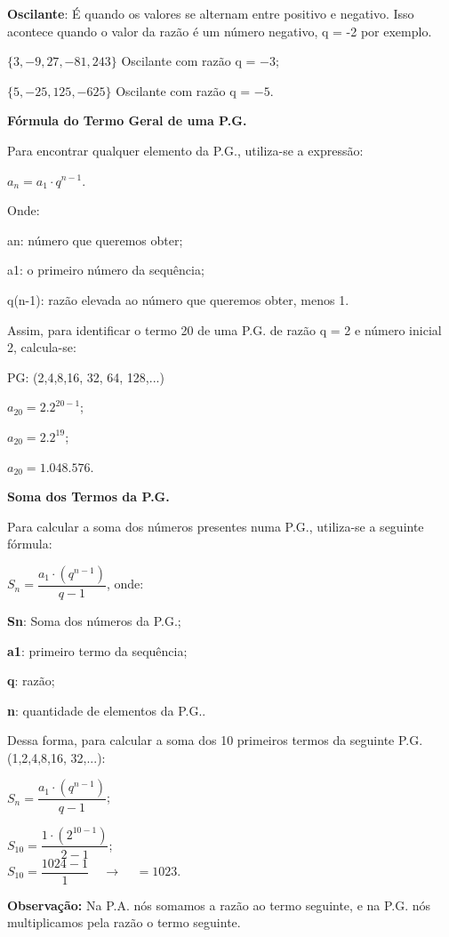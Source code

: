 \begin{multicols*}{2}
    \textbf{Oscilante}: É quando os valores se alternam entre positivo e negativo. Isso acontece quando o valor da razão é um número negativo, q = -2 por exemplo.

    $ \{ 3, -9, 27, -81, 243 \}$ Oscilante com razão q = $-3$;

    $ \{ 5, -25, 125, -625 \}$ Oscilante com razão q = $-5$.

    \textbf{Fórmula do Termo Geral de uma P.G.}

    Para encontrar qualquer elemento da P.G., utiliza-se a expressão:

    $ a_n = a_1 \cdot q^{n -1} $.

    Onde:

    an: número que queremos obter;

    a1: o primeiro número da sequência;

    q(n-1): razão elevada ao número que queremos obter, menos 1.

    Assim, para identificar o termo 20 de uma P.G. de razão q = 2 e número inicial 2, calcula-se:

    PG: (2,4,8,16, 32, 64, 128,...)

    $ a_20 = 2 . 2^{20-1} $;

    $ a_20 = 2 . 2^{19} $;

    $ a_20 = 1.048.576 $.

    \textbf{Soma dos Termos da P.G.}

    Para calcular a soma dos números presentes numa P.G., utiliza-se a seguinte fórmula:

    $ S_n = \dfrac{a_1 \cdot (q^{n -1})}{q -1} $, onde:

    \textbf{Sn}: Soma dos números da P.G.;

    \textbf{a1}: primeiro termo da sequência;

    \textbf{q}: razão;

    \textbf{n}: quantidade de elementos da P.G..

    Dessa forma, para calcular a soma dos 10 primeiros termos da seguinte P.G. (1,2,4,8,16, 32,...):

    $ S_n = \dfrac{a_1 \cdot (q^{n -1})}{q -1} $;

    $ S_{10} = \dfrac{1 \cdot (2^{10 -1})}{2 -1} $;\\

    $ S_{10} = \dfrac{1024 -1}{1} \ \ \ \ \ \to \ \ \ \ \ = 1023 $.

    \textbf{Observação:} Na P.A. nós somamos a razão ao termo seguinte, e na P.G. nós multiplicamos pela razão o termo seguinte.


\end{multicols*}
